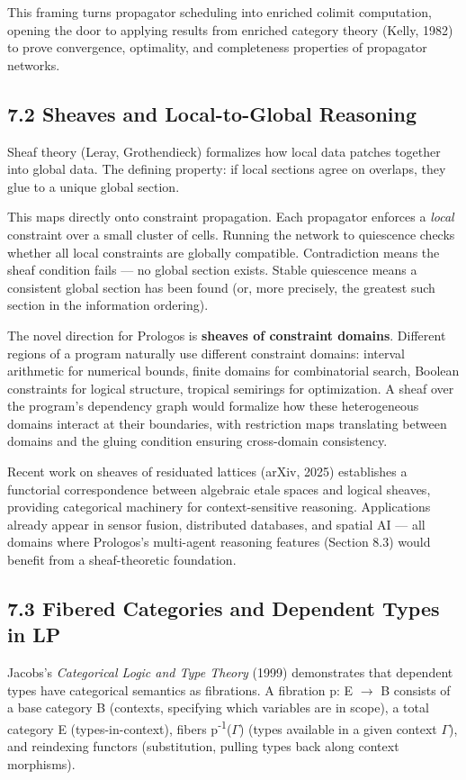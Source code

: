 \documentclass[11pt]{article}
\begin{document}
This framing turns propagator scheduling into enriched colimit computation, opening the door to applying results from enriched category theory (Kelly, 1982) to prove convergence, optimality, and completeness properties of propagator networks.
\subsection{7.2 Sheaves and Local-to-Global Reasoning}
\label{sec:org82839ec}

Sheaf theory (Leray, Grothendieck) formalizes how local data patches together into global data. The defining property: if local sections agree on overlaps, they glue to a unique global section.

This maps directly onto constraint propagation. Each propagator enforces a \emph{local} constraint over a small cluster of cells. Running the network to quiescence checks whether all local constraints are globally compatible. Contradiction means the sheaf condition fails --- no global section exists. Stable quiescence means a consistent global section has been found (or, more precisely, the greatest such section in the information ordering).

The novel direction for Prologos is \textbf{sheaves of constraint domains}. Different regions of a program naturally use different constraint domains: interval arithmetic for numerical bounds, finite domains for combinatorial search, Boolean constraints for logical structure, tropical semirings for optimization. A sheaf over the program's dependency graph would formalize how these heterogeneous domains interact at their boundaries, with restriction maps translating between domains and the gluing condition ensuring cross-domain consistency.

Recent work on sheaves of residuated lattices (arXiv, 2025) establishes a functorial correspondence between algebraic etale spaces and logical sheaves, providing categorical machinery for context-sensitive reasoning. Applications already appear in sensor fusion, distributed databases, and spatial AI --- all domains where Prologos's multi-agent reasoning features (Section 8.3) would benefit from a sheaf-theoretic foundation.
\subsection{7.3 Fibered Categories and Dependent Types in LP}
\label{sec:org7c49c83}

Jacobs's \emph{Categorical Logic and Type Theory} (1999) demonstrates that dependent types have categorical semantics as fibrations. A fibration p: E \(\to\) B consists of a base category B (contexts, specifying which variables are in scope), a total category E (types-in-context), fibers p\textsuperscript{-1}(\(\Gamma\)) (types available in a given context \(\Gamma\)), and reindexing functors (substitution, pulling types back along context morphisms).
\end{document}
